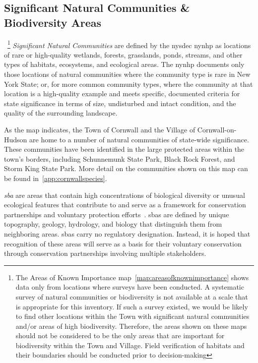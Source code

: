 \subsection*{Significant Natural Communities \& Biodiversity Areas}~\footnote{The 
Areas of Known Importance map~\ref{map:areasofknownimportance} shows data only 
from locations where surveys have been conducted. A systematic survey of natural 
communities or biodiversity is not available at a scale that is appropriate for 
this inventory. If such a survey existed, we would be likely to find other 
locations within the Town with significant natural communities and/or areas of 
high biodiversity. Therefore, the areas shown on these maps should not be 
considered to be the only areas that are important for biodiversity within the 
Town and Village. Field verification of habitats and their boundaries should be 
conducted prior to decision-making} \textit{Significant Natural Communities} are 
defined by the \gls{nysdec} \gls{nynhp} as locations of rare or high-quality 
wetlands, forests, grasslands, ponds, streams, and other types of habitats, 
ecosystems, and ecological areas. The \gls{nynhp} documents only those locations 
of natural communities where the community type is rare in New York State; or, 
for more common community types, where the community at that location is a 
high-quality example and meets specific, documented criteria for state 
significance in terms of size, undisturbed and intact condition, and the quality 
of the surrounding landscape.
\par
As the map indicates, the Town of Cornwall and the Village of
Cornwall-on-Hudson are home to a number of natural communities of state-wide
significance. These communities have been identified in the large protected
areas within the town's borders, including Schunnemunk State Park, Black Rock
Forest, and Storm King State Park. More detail on the communities shown on this
map can be found in~\ref{app:cornwallspecies}. 

\textit{\gls{sba}} are areas that contain high concentrations of biological diversity or
unusual ecological features that contribute to and serve as a framework for
conservation partnerships and voluntary protection efforts~\citep{haeckel2014}.
\gls{sba}s are defined by unique topography, geology, hydrology, and biology
that distinguish them from neighboring areas. \gls{sba}s carry no regulatory
designation. Instead, it is hoped that recognition of these areas will serve as
a basis for their voluntary conservation through conservation partnerships
involving multiple stakeholders.


